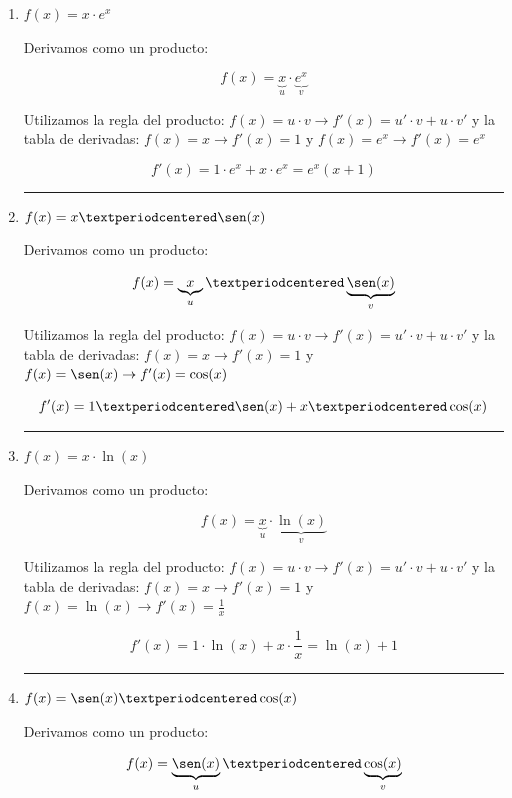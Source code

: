 \documentclass[palatino,nosec,nochap,nobuilddate]{Docencia}
\begin{document}
\begin{enumerate}
\vspace{0.3cm}\hrule\vspace{0.6cm} \item $\displaystyle f(x) = x·e^x$

	Derivamos como un producto:

	\[
		f(x) = \underbrace{x}_{u}·\underbrace{e^x}_{v}
	\]

	Utilizamos la regla del producto: $f(x) = u·v \to f'(x) = u'·v + u·v'$ y la tabla de derivadas: $f(x) = x \to f'(x) = 1$ y $f(x) = e^x \to f'(x) = e^x$

	\[
		f'(x) = 1·e^x + x·e^x = e^x(x+1)
	\]




\vspace{0.3cm}\hrule\vspace{0.6cm} \item $\displaystyle f(x) = x·\sen(x)$
	
	Derivamos como un producto:

	\[
		f(x) = \underbrace{x}_{u}·\underbrace{\sen(x)}_{v}
	\]

	Utilizamos la regla del producto: $f(x) = u·v \to f'(x) = u'·v + u·v'$ y la tabla de derivadas: $f(x) = x \to f'(x) = 1$ y $f(x) = \sen(x) \to f'(x) = \cos(x)$

	\[
		f'(x) = 1·\sen(x) + x·\cos(x)
	\]


	


\vspace{0.3cm}\hrule\vspace{0.6cm} \item $\displaystyle f(x) = x·\ln(x)$

	Derivamos como un producto:

	\[
		f(x) = \underbrace{x}_{u}·\underbrace{\ln(x)}_{v}
	\]

	Utilizamos la regla del producto: $f(x) = u·v \to f'(x) = u'·v + u·v'$ y la tabla de derivadas: $f(x) = x \to f'(x) = 1$ y $f(x) = \ln(x) \to f'(x) = \frac{1}{x}$

	\[
		f'(x) = 1·\ln(x) + x·\frac{1}{x} = \ln(x) + 1
	\]




\vspace{0.3cm}\hrule\vspace{0.6cm} \item $\displaystyle f(x) = \sen(x)·\cos(x)$

	Derivamos como un producto:

	\[
		f(x) = \underbrace{\sen(x)}_{u}·\underbrace{\cos(x)}_{v}
	\]


\end{enumerate}
\end{document}

